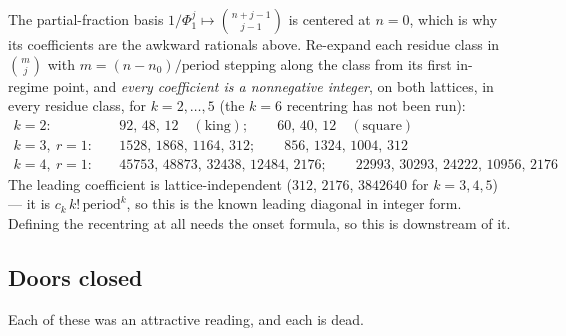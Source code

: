 \documentclass[11pt]{article}
\newcommand{\Phid}{\Phi}
\begin{document}
The partial-fraction basis $1/\Phid_1^j \mapsto \binom{n+j-1}{j-1}$ is centered at
$n = 0$, which is why its coefficients are the awkward rationals above.
Re-expand each residue class in $\binom{m}{j}$ with $m = (n - n_0)/\text{period}$
stepping along the class from its first in-regime point, and \emph{every
coefficient is a nonnegative integer}, on both lattices, in
every residue class, for $k = 2,\dots,5$ (the $k = 6$ recentring has not
been run):
\[
\begin{aligned}
  k = 2:&\quad 92,\,48,\,12 \quad(\text{king}); \qquad 60,\,40,\,12 \quad(\text{square}) \\
  k = 3,\ r = 1:&\quad 1528,\,1868,\,1164,\,312; \qquad 856,\,1324,\,1004,\,312 \\
  k = 4,\ r = 1:&\quad 45753,\,48873,\,32438,\,12484,\,2176; \qquad 22993,\,30293,\,24222,\,10956,\,2176
\end{aligned}
\]
The leading coefficient is lattice-independent ($312$, $2176$, $3842640$ for
$k = 3,4,5$) --- it is $c_k\,k!\,\text{period}^k$, so this is the known leading
diagonal in integer form. Defining the recentring at all needs
the onset formula, so this is downstream of it.

\subsection{Doors closed}
\label{sec:closed}

Each of these was an attractive reading, and each is dead.
\end{document}
